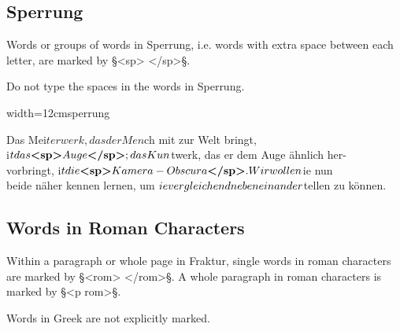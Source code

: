 
\tocspace
\subsection{Sperrung}
\label{section sperrung}

\begin{mainrule}
Words or groups of words in Sperrung, i.e. words with extra space between each letter, are marked by §<sp> </sp>§.
\end{mainrule}

\begin{clarification}
Do not type the spaces in the words in Sperrung.
\end{clarification}

\vspace{3mm}
\begin{sampleImageSmall}{width=12cm}{sperrung}
\begin{typeLatin}
Das Mei$terwerk, das der Men$ch mit zur Welt bringt, \\
i$t das \bold{<sp>}Auge\bold{</sp>}; das Kun$twerk, das er dem Auge ähnlich her- \\
vorbringt, i$t die \bold{<sp>}Kamera-Obscura\bold{</sp>}. Wir wollen $ie nun \\
beide näher kennen lernen, um $ie vergleichend neben einander \\
$tellen zu können.
\end{typeLatin}
\end{sampleImageSmall}

\tocspace
\subsection{Words in Roman Characters}
\label{section words in roman characters}

\begin{mainrule}
Within a paragraph or whole page in Fraktur, single words in roman characters are marked by  §<rom> </rom>§. A whole paragraph in roman characters is marked by §<p rom>§.
\end{mainrule}

\begin{clarification}
Words in Greek are not explicitly marked.
\end{clarification}

